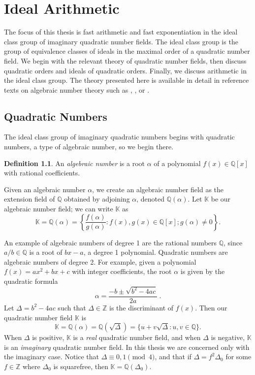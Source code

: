 \documentclass{ucalgthes1}
\theoremstyle{plain}
\theoremstyle{definition}
\newtheorem{defn}[thm]{Definition}
\newcommand{\KK}{\mathbb{K}}
\newcommand{\ZZ}{\mathbb{Z}}
\newcommand{\QQ}{\mathbb{Q}}
\begin{document}
\setcounter{chapter}{1}
\chapter{Ideal Arithmetic}
\label{chap:idealArithmetic}

The focus of this thesis is fast arithmetic and fast exponentiation in the ideal class group of imaginary quadratic number fields.  The ideal class group is the group of equivalence classes of ideals in the maximal order of a quadratic number field.   We begin with the relevant theory of quadratic number fields, then discuss quadratic orders and ideals of quadratic orders.  Finally, we discuss arithmetic in the ideal class group.  The theory presented here is available in detail in reference texts on algebraic number theory such as \cite{IR90}, \cite{Hua82}, or \cite{Coh80}. 



\section{Quadratic Numbers}

The ideal class group of imaginary quadratic numbers begins with quadratic numbers, a type of algebraic number, so we begin there.   

\begin{defn}
An \emph{algebraic number} is a root $\alpha$ of a polynomial $f(x) \in \QQ[x]$ with rational coefficients.
\end{defn}

\noindent
Given an algebraic number $\alpha$, we create an algebraic number field as the extension field of $\QQ$ obtained by adjoining $\alpha$, denoted $\QQ(\alpha)$. Let $\KK$ be our algebraic number field; we can write $\KK$ as
\[
	\KK = \QQ(\alpha) = \left\{ \frac{f(\alpha)}{g(\alpha)} : f(x), g(x) \in \QQ[x]; g(\alpha) \ne 0 \right\}.
\]

\noindent
An example of algebraic numbers of degree 1 are the rational numbers $\QQ$, since $a/b \in \QQ$ is a root of $bx - a$, a degree 1 polynomial.  Quadratic numbers are algebraic numbers of degree 2.  For example, given a polynomial $f(x) = ax^2 + bx + c$ with integer coefficients, the root $\alpha$ is given by the quadratic formula
\[
	\alpha = \frac{-b \pm \sqrt{b^2 - 4ac}}{2a} ~.
\]
Let $\Delta = b^2 -4ac$ such that $\Delta \in \ZZ$ is the discriminant of $f(x)$.  Then our quadratic number field $\KK$ is 
\[
	\KK = \QQ(\alpha) = \QQ(\sqrt{\Delta}) = \{u + v\sqrt{\Delta} : u,v \in \QQ\}.
\]
When $\Delta$ is positive, $\KK$ is a \emph{real} quadratic number field, and when $\Delta$ is negative, $\KK$ is an \emph{imaginary} quadratic number field.  In this thesis we are concerned only with the imaginary case.  Notice that $\Delta \equiv 0,1 \pmod 4$, and that if $\Delta = f^2 \Delta_0$ for some $f \in \ZZ$ where $\Delta_0$ is squarefree, then $\KK = \QQ(\Delta_0)$.
\end{document}
